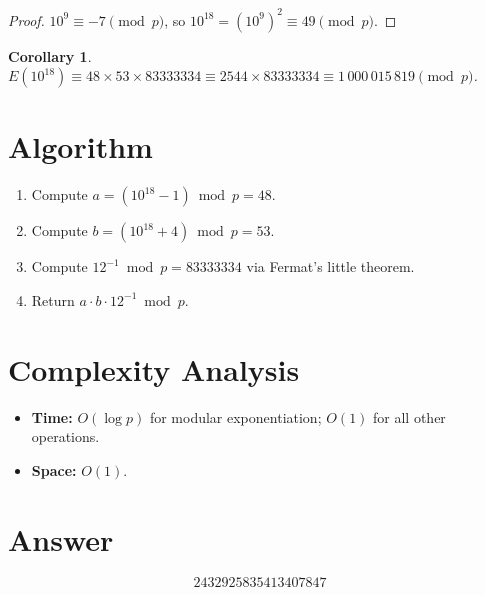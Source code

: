 \documentclass[11pt]{article}
\newtheorem{corollary}[theorem]{Corollary}
\begin{document}
\begin{proof}
$10^9 \equiv -7\pmod{p}$, so $10^{18} = (10^9)^2 \equiv 49\pmod{p}$.
\end{proof}

\begin{corollary}
$E(10^{18}) \equiv 48 \times 53 \times 83333334 \equiv 2544 \times 83333334 \equiv 1\,000\,015\,819 \pmod{p}$.
\end{corollary}

\section{Algorithm}

\begin{enumerate}
    \item Compute $a = (10^{18}-1) \bmod p = 48$.
    \item Compute $b = (10^{18}+4) \bmod p = 53$.
    \item Compute $12^{-1} \bmod p = 83333334$ via Fermat's little theorem.
    \item Return $a \cdot b \cdot 12^{-1} \bmod p$.
\end{enumerate}

\section{Complexity Analysis}
\begin{itemize}
    \item \textbf{Time:} $O(\log p)$ for modular exponentiation; $O(1)$ for all other operations.
    \item \textbf{Space:} $O(1)$.
\end{itemize}

\section{Answer}

\[
\boxed{2432925835413407847}
\]
\end{document}
